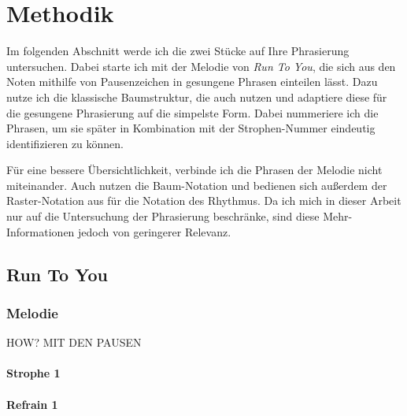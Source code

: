 \chapter{Methodik}
\label{chap:Methodik}
\pagestyle{plain}

Im folgenden Abschnitt werde ich die zwei Stücke auf Ihre Phrasierung untersuchen. Dabei starte ich mit der Melodie von \textit{Run To You}, die sich aus den Noten mithilfe von Pausenzeichen in gesungene Phrasen einteilen lässt. Dazu nutze ich die klassische Baumstruktur, die auch \cite{lerdahl1983generative} nutzen und adaptiere diese für die gesungene Phrasierung auf die simpelste Form. Dabei nummeriere ich die Phrasen, um sie später in Kombination mit der Strophen-Nummer eindeutig identifizieren zu können. 

Für eine bessere Übersichtlichkeit, verbinde ich die Phrasen der Melodie nicht miteinander. Auch \cite{hayes1996role} nutzen die Baum-Notation und bedienen sich außerdem der Raster-Notation aus \cite{liberman1975intonational} für die Notation des Rhythmus. Da ich mich in dieser Arbeit nur auf die Untersuchung der Phrasierung beschränke, sind diese Mehr-Informationen jedoch von geringerer Relevanz.

\tiny 

\section*{Run To You}

\subsection*{Melodie}

HOW? MIT DEN PAUSEN

\subsubsection*{Strophe 1}


\subsubsection*{Refrain 1}

